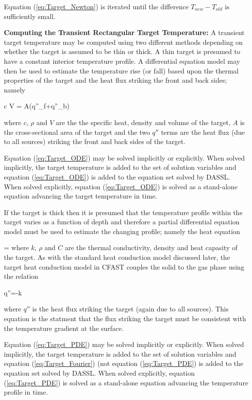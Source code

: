 Equation (\ref{eq:Target_Newton}) is iterated until the difference $T_{new} - T_{old}$ is sufficiently small.

{\bf Computing the Transient Rectangular Target Temperature:}
A transient target temperature may be computed using two different methods
depending on whether the target is assumed to be thin or thick.  A thin target
is presumed to have a constant interior temperature profile. A differential equation model may then be used to estimate the
temperature rise (or fall) based upon the thermal properties of the target and the
heat flux striking the front and back sides; namely

\be c \rho V  = A(q''_f+q''_b) \label{eq:Target_ODE} \ee

where $c$, $\rho$ and $V$ are the the specific heat, density and volume of the target, $A$ is the cross-sectional area of the target and the two $q''$ terms are the heat flux (due to all sources) striking the front and back sides of the target.

Equation (\ref{eq:Target_ODE}) may be solved implicitly or explicitly.  When solved implicitly, the target temperature is added to the set of solution variables and equation (\ref{eq:Target_ODE}) is added to the equation set solved by DASSL.
When solved explicitly, equation (\ref{eq:Target_ODE}) is solved as a stand-alone equation advancing the target temperature in time.


If the target is thick then it is presumed that the temperature profile within the target varies as a function of depth and therefore a partial differential equation model must be used to estimate the changing profile; namely the heat equation

\be {} = 
\label{eq:Target_PDE} \ee
where $k$, $\rho$ and $C$ are the thermal conductivity, density and heat capasity of the target.  As with the standard heat conduction model discussed later, the target heat conduction model in CFAST couples the solid to the gas phase using the relation

\be q''=-k \label{eq:Target_Fourier}\ee

where $q''$ is the heat flux striking the target (again due to all sources).  This equation is the statment that the flux striking the target must be consistent with the temperature gradient at the surface.

Equation (\ref{eq:Target_PDE}) may be solved implicitly or explicitly.  When solved implicitly, the target temperature is added to the set of solution variables and equation (\ref{eq:Target_Fourier}) (not equation (\ref{eq:Target_PDE}) is added to the equation set solved by DASSL.
When solved explicitly, equation (\ref{eq:Target_PDE}) is solved as a stand-alone equation advancing the temperature profile in time.

